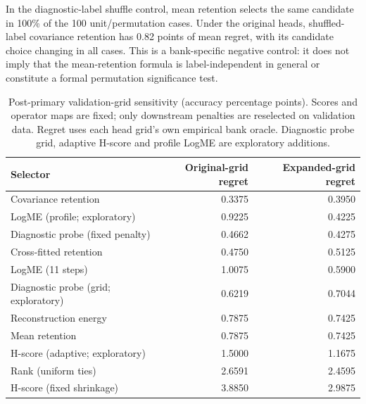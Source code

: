 In the diagnostic-label shuffle control, mean retention selects the same candidate in 100\% of the 100 unit/permutation cases. Under the original heads, shuffled-label covariance retention has 0.82 points of mean regret, with its candidate choice changing in all cases. This is a bank-specific negative control: it does not imply that the mean-retention formula is label-independent in general or constitute a formal permutation significance test.
\begin{table}[t]
\centering\small
\caption{Post-primary validation-grid sensitivity (accuracy percentage points). Scores and operator maps are fixed; only downstream penalties are reselected on validation data. Regret uses each head grid's own empirical bank oracle. Diagnostic probe grid, adaptive H-score and profile LogME are exploratory additions.}\label{tab:grid}
\begin{tabular}{lrr}\toprule Selector & Original-grid regret & Expanded-grid regret\\\midrule
Covariance retention & 0.3375 & 0.3950\\
LogME (profile; exploratory) & 0.9225 & 0.4225\\
Diagnostic probe (fixed penalty) & 0.4662 & 0.4275\\
Cross-fitted retention & 0.4750 & 0.5125\\
LogME (11 steps) & 1.0075 & 0.5900\\
Diagnostic probe (grid; exploratory) & 0.6219 & 0.7044\\
Reconstruction energy & 0.7875 & 0.7425\\
Mean retention & 0.7875 & 0.7425\\
H-score (adaptive; exploratory) & 1.5000 & 1.1675\\
Rank (uniform ties) & 2.6591 & 2.4595\\
H-score (fixed shrinkage) & 3.8850 & 2.9875\\
\bottomrule\end{tabular}\end{table}
